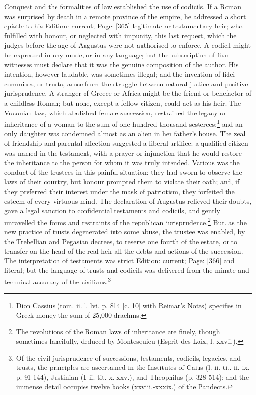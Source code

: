 Conquest and the formalities of law established the use of codicils. If a Roman was surprised by death in a remote province of the empire, he addressed a short epistle to his Edition: current; Page: [365] legitimate or testamentary heir; who fulfilled with honour, or neglected with impunity, this last request, which the judges before the age of Augustus were not authorised to enforce. A codicil might be expressed in any mode, or in any language; but the subscription of five witnesses must declare that it was the genuine composition of the author. His intention, however laudable, was sometimes illegal; and the invention of fidei-commissa, or trusts, arose from the struggle between natural justice and positive jurisprudence. A stranger of Greece or Africa might be the friend or benefactor of a childless Roman; but none, except a fellow-citizen, could act as his heir. The Voconian law, which abolished female succession, restrained the legacy or inheritance of a woman to the sum of one hundred thousand sesterces;\footnote{Dion Cassius (tom. ii. l. lvi. p. 814 [c. 10] with Reimar\texthebrew{}’s Notes) specifies in Greek money the sum of 25,000 drachms.} and an only daughter was condemned almost as an alien in her father\texthebrew{}’s house. The zeal of friendship and parental affection suggested a liberal artifice: a qualified citizen was named in the testament, with a prayer or injunction that he would restore the inheritance to the person for whom it was truly intended. Various was the conduct of the trustees in this painful situation: they had sworn to observe the laws of their country, but honour prompted them to violate their oath; and, if they preferred their interest under the mask of patriotism, they forfeited the esteem of every virtuous mind. The declaration of Augustus relieved their doubts, gave a legal sanction to confidential testaments and codicils, and gently unravelled the forms and restraints of the republican jurisprudence.\footnote{The revolutions of the Roman laws of inheritance are finely, though sometimes fancifully, deduced by Montesquieu (Esprit des Loix, l. xxvii.).} But, as the new practice of trusts degenerated into some abuse, the trustee was enabled, by the Trebellian and Pegasian decrees, to reserve one fourth of the estate, or to transfer on the head of the real heir all the debts and actions of the succession. The interpretation of testaments was strict Edition: current; Page: [366] and literal; but the language of trusts and codicils was delivered from the minute and technical accuracy of the civilians.\footnote{Of the civil jurisprudence of successions, testaments, codicils, legacies, and trusts, the principles are ascertained in the Institutes of Caius (l. ii. tit. ii.-ix. p. 91-144), Justinian (l. ii. tit. x.-xxv.), and Theophilus (p. 328-514); and the immense detail occupies twelve books (xxviii.-xxxix.) of the Pandects.}

